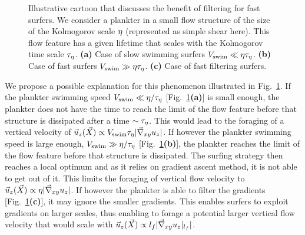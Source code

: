\begin{figure}
	\centering
	\def\svgwidth{0.8\textwidth}
	
  	\caption[Illustrative cartoon that discusses the benefit of filtering for fast surfers.]{
  		Illustrative cartoon that discusses the benefit of filtering for fast surfers.
  		We consider a plankter in a small flow structure of the size of the Kolmogorov scale $\eta$ (represented as simple shear here). This flow feature has a given lifetime that scales with the Kolmogorov time scale $\tau_{\eta}$.
  		\textbf{(a)} Case of slow swimming surfers $V_{\mathrm{swim}} \ll \eta \tau_{\eta}$.
  		\textbf{(b)} Case of fast surfers $V_{\mathrm{swim}} \gg \eta \tau_{\eta}$.
  		\textbf{(c)} Case of fast filtering surfers.
  	}
  	\label{fig:filtering_surfers}
\end{figure}
We propose a possible explanation for this phenomenon illustrated in Fig.~\ref{fig:filtering_surfers}.
If the plankter swimming speed $V_{\mathrm{swim}} \ll \eta / \tau_{\eta}$ [Fig.~\ref{fig:filtering_surfers}\textbf{(a)}] is small enough, the plankter does not have the time to reach the limit of the flow feature before that structure is dissipated after a time $\sim \tau_{\eta}$. 
This would lead to the foraging of a vertical velocity of $\vec{u}_{z}(\vec{X}) \propto V_{\mathrm{swim}} \tau_{\eta} \lvert\vec{\nabla}_{xy} u_{z}\rvert$.
If however the plankter swimming speed is large enough, $V_{\mathrm{swim}} \gg \eta / \tau_{\eta}$ [Fig.~\ref{fig:filtering_surfers}\textbf{(b)}], the plankter reaches the limit of the flow feature before that structure is dissipated.
The surfing strategy then reaches a local optimum and as it relies on gradient ascent method, it is not able to get out of it.
This limits the foraging of vertical flow velocity to $\vec{u}_{z}(\vec{X}) \propto \eta \lvert\vec{\nabla}_{xy} u_{z}\rvert$.
If however the plankter is able to filter the gradients [Fig.~\ref{fig:filtering_surfers}\textbf{(c)}], it may ignore the smaller gradients.
This enables surfers to exploit gradients on larger scales, thus enabling to forage a potential larger vertical flow velocity that would scale with $\vec{u}_{z}(\vec{X}) \propto l_{f} \lvert\vec{\nabla}_{xy} u_{z}|_{l_{f}}\rvert$.

